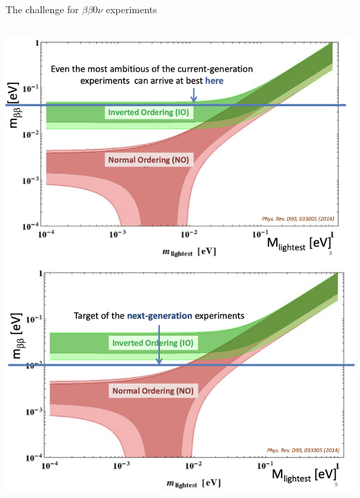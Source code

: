 \documentclass [aspectratio=169]{beamer}
\begin{document}
\begin{frame}{The challenge for $\beta\beta0\nu$ experiments}

\begin{columns}
\includegraphics[scale=0.24]{landscapes.png}


\end{columns}
\end{frame}
\end{document}

